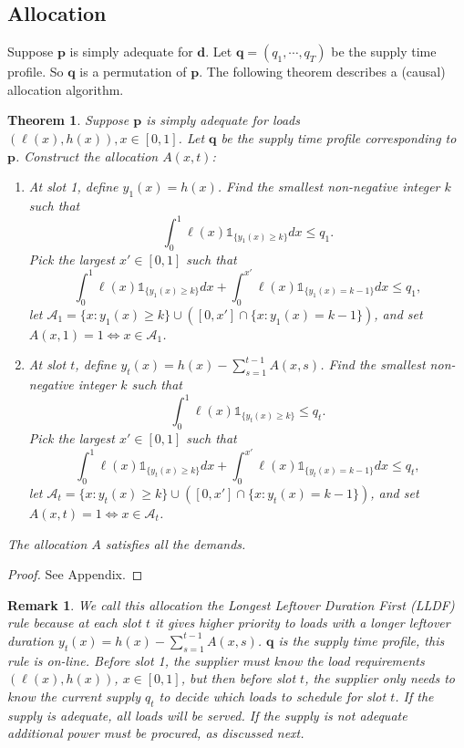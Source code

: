 \documentclass[10pt,draftcls,onecolumn]{IEEEtran}
\newtheorem{theorem}{Theorem}
\newtheorem{remark}{Remark}
\let \VEC \mathbf
\def\ind{{\mathds{1}}}
\newcounter{l1}
\newcounter{l2}
\newcounter{l3}
\begin{document}
\subsection{Allocation}
Suppose $\VEC p$ is simply adequate for $\VEC d$. Let $\VEC{q} = (q_1, \cdots, q_T)$ be the supply time profile.  So $\VEC q$ is a permutation of $\VEC p$.   The following theorem describes a (causal) allocation algorithm.
\begin{theorem}\label{thm:continuum_allocation}
Suppose $\VEC p$ is simply adequate for  loads $(\ell(x),h(x)), x \in [0,1]$.  Let $\VEC q$ be the supply time profile corresponding to   $\VEC p$. Construct the  allocation $A(x,t)$:
\begin{enumerate}
\item At slot 1, define $y_1(x)=h(x)$. Find the smallest non-negative integer $k$ such that
\begin{equation}\nonumber
\int_0^1 \ell(x) \ind_{\{y_1(x) \geq k\}}dx \leq q_1.
\end{equation}
Pick the largest $x' \in [0,1]$ such that
\begin{equation}\nonumber
\int_0^1 \ell(x) \ind_{\{y_1(x) \geq k\}}dx + \int_0^{x'} \ell(x) \ind_{\{y_1(x) = k-1\}}dx \leq q_1 ,
\end{equation}
let  $\mathcal{A}_1=\{x : y_1(x) \geq k \} \cup \left([0,x'] \cap \{x : y_1(x) =k-1 \}  \right)$, and set $A(x,1)=1 \iff x \in \mathcal{A}_1$.
\item At slot $t$, define $y_t(x)=h(x) - \sum_{s=1}^{t-1} A(x,s)$. Find the smallest non-negative integer $k$ such that
\begin{equation}\nonumber
\int_0^1 \ell(x) \ind_{\{y_t(x) \geq k\}} \leq q_t .
\end{equation}
Pick the largest $x' \in [0,1]$ such that
\begin{equation}\nonumber
\int_0^1 \ell(x) \ind_{\{y_t(x) \geq k\}}dx + \int_0^{x'} \ell(x) \ind_{\{y_t(x) = k-1\}}dx \leq q_t ,
\end{equation}
let  $\mathcal{A}_t=\{x : y_t(x) \geq k \} \cup \left([0,x'] \cap \{x : y_t(x) =k-1 \}  \right)$, and set $A(x,t)=1 \iff x \in \mathcal{A}_t$.
\end{enumerate}
The allocation $A$ satisfies all the demands.
\end{theorem}
\begin{proof}
See Appendix.
\end{proof}
\begin{remark}
We call this allocation the Longest Leftover Duration First (LLDF) rule because at each slot $t$ it gives higher priority to loads with a longer leftover duration $y_t(x) = h(x) - \sum_{s=1}^{t-1} A(x,s)$.
$\VEC q$ is the supply time profile, this rule is on-line. 
 Before slot 1, the supplier must know the load requirements $(\ell (x), h(x))$, $x \in [0,1]$, but
then before slot $t$, the supplier only needs to know the current supply $q_t$ to decide which loads to schedule for slot $t$.  If the supply is adequate, all loads will be served.  If the supply is not adequate additional power must be procured, as discussed next.
\end{remark}
\end{document}

